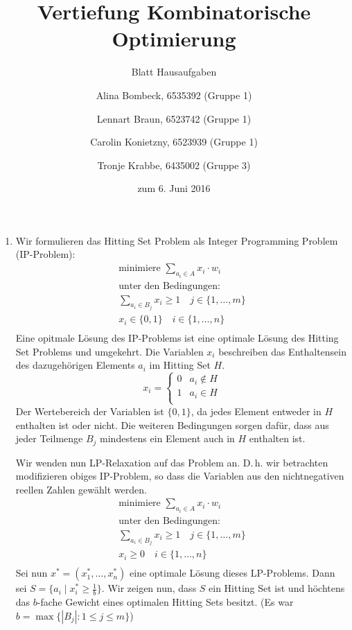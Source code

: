 \documentclass[a4paper]{scrartcl}
\title{Vertiefung Kombinatorische Optimierung}
\subtitle{Blatt {\blattnr} Hausaufgaben}
\author{%
    Alina Bombeck, 6535392 (Gruppe 1) \and
    Lennart Braun, 6523742 (Gruppe 1) \and
    Carolin Konietzny, 6523939 (Gruppe 1) \and
    Tronje Krabbe, 6435002 (Gruppe 3)
}
\date{zum 6. Juni 2016}
\begin{document}
\maketitle


\begin{enumerate}[label=\bfseries \arabic*.]
\item %
    Wir formulieren das Hitting Set Problem als Integer Programming Problem
    (IP-Problem):
    \begin{equation*}
        \begin{gathered}
            \text{minimiere } \sum_{a_i \in A} x_i \cdot w_i \\
            \text{unter den Bedingungen:} \\
            \sum_{a_i \in B_j} x_i \geq 1 \quad j \in \{1, \dotsc, m\} \\
            x_i \in \{0,1\} \quad i \in \{1, \dotsc, n\} \\
        \end{gathered}
    \end{equation*}
    Eine opitmale Lösung des IP-Problems ist eine optimale Lösung des Hitting
    Set Problems und umgekehrt. Die Variablen $x_i$ beschreiben das
    Enthaltensein des dazugehörigen Elements $a_i$ im Hitting Set $H$.
    \begin{equation*}
        x_i =
        \begin{cases}
            0 & a_i \notin H \\
            1 & a_i \in H \\
        \end{cases}
    \end{equation*}
    Der Wertebereich der Variablen ist $\{0,1\}$, da jedes Element entweder in
    $H$ enthalten ist oder nicht. Die weiteren Bedingungen sorgen dafür, dass
    aus jeder Teilmenge $B_j$ mindestens ein Element auch in $H$ enthalten ist.

    Wir wenden nun LP-Relaxation auf das Problem an. D.\,h. wir betrachten
    modifizieren obiges IP-Problem, so dass die Variablen aus den
    nichtnegativen reellen Zahlen gewählt werden.
    \begin{equation*}
        \begin{gathered}
            \text{minimiere } \sum_{a_i \in A} x_i \cdot w_i \\
            \text{unter den Bedingungen:} \\
            \sum_{a_i \in B_j} x_i \geq 1 \quad j \in \{1, \dotsc, m\} \\
            x_i \geq 0 \quad i \in \{1, \dotsc, n\} \\
        \end{gathered}
    \end{equation*}
    Sei nun $x^\ast = (x^\ast_1, \dotsc, x^\ast_n)$ eine optimale Lösung dieses
    LP-Problems.
    Dann sei $S = \{ a_i \mid x^\ast_i \geq \frac{1}{b} \}$.
    Wir zeigen nun, dass $S$ ein Hitting Set ist und höchtens das $b$-fache
    Gewicht eines optimalen Hitting Sets besitzt.
    (Es war $b = \max\{|B_j| : 1 \leq j \leq m\}$)


\end{enumerate}
\end{document}
